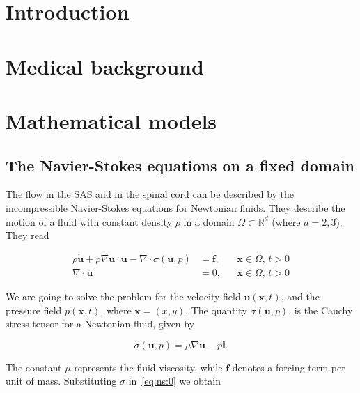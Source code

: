 \documentclass[11pt,a4paper,titlepage]{report}
\begin{document}

\tableofcontents
{}

\newpage


\chapter{Introduction}

\chapter{Medical background}

\chapter{Mathematical models}

\section{The Navier-Stokes equations on a fixed domain}


The flow in the SAS and in the spinal cord can be described by the incompressible Navier-Stokes equations for Newtonian fluids. They describe the motion of a fluid with constant density $\rho$ in a domain $\Omega \subset \mathbb{R}^d$ (where $d=2,3$). They read

\begin{align}
\label{eq:ns:0}
\rho \dot{\mathbf{u}}
+ \rho \nabla \mathbf{u} \cdot \mathbf{u}
- \nabla \cdot \sigma(\mathbf{u},p)
&= \mathbf{f},  && \mathbf{x} \in \Omega, \, t>0 \\
\nabla \cdot \mathbf{u} &= 0, && \mathbf{x} \in \Omega, \, t>0
\end{align}

We are going to solve the problem for the velocity field $\mathbf{u}(\mathbf{x},t)$, and the pressure field $p(\mathbf{x},t)$, where $\mathbf{x} = (x,y)$. The quantity $\sigma(\mathbf{u}, p)$, is the Cauchy stress tensor for a Newtonian fluid, given by

\begin{equation}
\sigma(\mathbf{u}, p) = \mu \nabla \mathbf{u} - p \mathbb{I}.
\end{equation}

The constant $\mu$ represents the fluid viscosity, while $\mathbf{f}$ denotes a forcing term per unit of mass. Substituting $\sigma$ in~\eqref{eq:ns:0} we obtain
\end{document}
